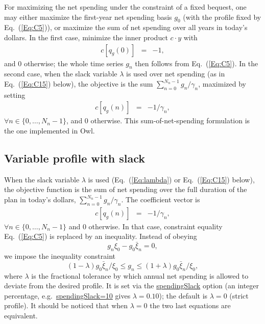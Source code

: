 \documentclass[fleqn,12pt]{report}
\newcommand{\code}[1]{\url{#1}}
\begin{document}
For maximizing the net spending under the constraint of a fixed bequest, one may either
maximize the first-year net spending basis $g_0$ (with the profile fixed by Eq.~(\ref{Eq:C5})),
or maximize the sum of net spending over all years in today's dollars.
In the first case, minimize the inner product $c\cdot y$ with
\begin{eqnarray}
	c[q_g(0)] &=& -1,
\end{eqnarray}
and 0 otherwise; the whole time series $g_n$ then follows from Eq.~(\ref{Eq:C5}).
In the second case, when the slack variable $\lambda$ is used over net spending
(as in Eq.~(\ref{Eq:C15}) below), the objective is the sum
$\sum_{n=0}^{N_n-1} g_n/\gamma_n$, maximized by setting
\begin{eqnarray}
	c[q_g(n)] &=& -1/\gamma_n,
\end{eqnarray}
$\forall n \in \{0, \ldots, N_n-1\}$, and 0 otherwise.
This sum-of-net-spending formulation is the one implemented in Owl.

\subsection*{Variable profile with slack}
When the slack variable $\lambda$ is used (Eq.~(\ref{Eq:lambda}) or Eq.~(\ref{Eq:C15}) below),
the objective function is the sum of net spending over the full duration of the plan in today's dollars,
$\sum_{n=0}^{N_n-1} g_n/\gamma_n$. The coefficient vector is
\begin{eqnarray}
	c[q_g(n)] &=& -1/\gamma_n,
\end{eqnarray}
$\forall n \in \{0, \ldots, N_n-1\}$ and 0 otherwise.
In that case, constraint equality Eq.~(\ref{Eq:C5}) is replaced by an inequality.
Instead of obeying 
\begin{equation}
	g_n \xi_0 - g_0 \bar{\xi}_n = 0,
\end{equation}
we impose the inequality constraint
\begin{equation}
        \label{Eq:C15}
	(1 - \lambda) g_0 \bar{\xi}_n/\xi_0 \le g_n \le (1 + \lambda) g_0 \bar{\xi}_n/\xi_0 ,
\end{equation}
where $\lambda$ is the fractional tolerance by which annual net spending
is allowed to deviate from the desired profile.
It is set via the \code{spendingSlack} option (an integer percentage,
e.g.\ \code{spendingSlack=10} gives $\lambda=0.10$); the default is
$\lambda=0$ (strict profile).
It should be noticed that when $\lambda = 0$ the two last equations are
equivalent.
\end{document}
